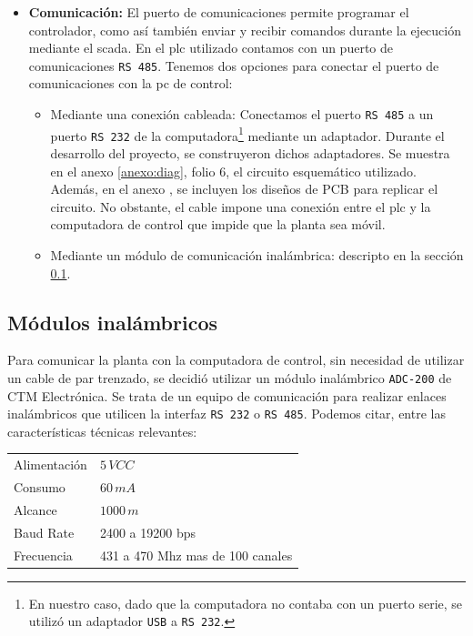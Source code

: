 \begin{itemize}
\item \textbf{Comunicación:} El puerto de comunicaciones permite programar el 
controlador, como así también enviar y recibir comandos durante la ejecución 
mediante el \gls{scada}. En el \gls{plc} utilizado contamos con un puerto de 
comunicaciones \verb|RS 485|. Tenemos dos opciones para conectar el puerto de 
comunicaciones con la pc de control:
\begin{itemize}
 \item Mediante una conexión cableada: Conectamos el puerto \verb|RS 485| a un 
puerto \verb|RS 232| de la computadora\footnote{En nuestro caso, dado que la 
computadora no contaba con un puerto serie, se utilizó un adaptador 
\texttt{USB} a \texttt{RS 232}.} mediante un adaptador. Durante el desarrollo 
del proyecto, se construyeron dichos adaptadores. 
Se muestra en el anexo \ref{anexo:diag}, folio 6, el circuito esquemático 
utilizado. Además, en el anexo , se incluyen los diseños de PCB 
para replicar el circuito. No obstante, el cable impone una conexión entre el 
\gls{plc} y la computadora de control que impide que la planta sea móvil.
\item Mediante un módulo de comunicación inalámbrica:
descripto en la sección \ref{subsec:inalambrico}.
\end{itemize}

\end{itemize}

\subsection{Módulos inalámbricos}
\label{subsec:inalambrico}

Para comunicar la planta con la computadora de control, sin necesidad de 
utilizar un cable de par trenzado, se decidió utilizar un módulo inalámbrico
\verb|ADC-200| de CTM Electrónica. Se trata de un equipo de comunicación para 
realizar enlaces inalámbricos que utilicen la interfaz \verb|RS 232| o 
\verb|RS 485|. Podemos citar, entre las características técnicas relevantes:

\begin{center}
\begin{tabular}{|l|l|}
\hline
Alimentación & $5\,VCC$\\
Consumo& $60\,mA$\\
Alcance& $1000\,m$\\
Baud Rate &2400 a 19200 bps \\
Frecuencia& 431 a 470 Mhz mas de 100 canales\\
\hline
\end{tabular}
\end{center}

